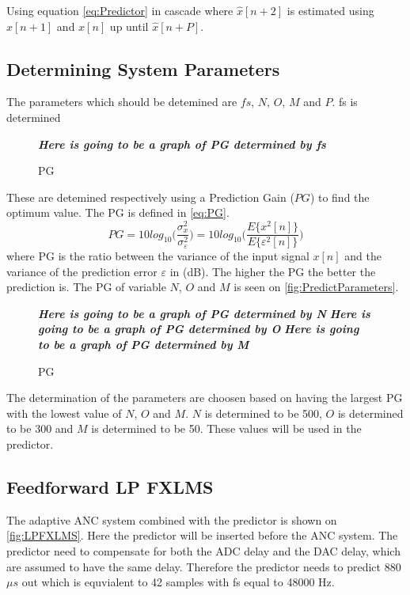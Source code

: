 Using equation \ref{eq:Predictor} in cascade where $\hat{x}[n+2]$ is estimated using $\hat{x}[n+1]$ and $x[n]$ up until $\hat{x}[n+P]$. 

\subsection{Determining System Parameters}
The parameters which should be detemined are $fs$, $N$, $O$, $M$ and $P$. fs is determined   


\begin{figure}[H]
	\centering
	\textbf{\textit{Here is going to be a graph of PG determined by fs}}
	\caption{PG }
	\label{fig:fsPredict}
\end{figure}


These are detemined respectively using a Prediction Gain ($PG$) to find the optimum value. The PG is defined in \autoref{eq:PG}. 
\begin{equation}\label{eq:PG}
PG = 10 log_{10}\bigg(\frac{\sigma^2_x}{\sigma^2_\varepsilon}\bigg) = 10 log_{10}\bigg(\frac{E\{x^2[n]\}}{E\{\varepsilon^2[n]\}}\bigg)
\end{equation}
where PG is the ratio between the variance of the input signal $x[n]$ and the variance of the prediction error $\varepsilon$ in (dB). The higher the PG the better the prediction is. The PG of variable $N$, $O$ and $M$ is seen on \autoref{fig:PredictParameters}. 
\begin{figure}[H]
	\centering
	\textbf{\textit{Here is going to be a graph of PG determined by N}}
	\textbf{\textit{Here is going to be a graph of PG determined by O}}
	\textbf{\textit{Here is going to be a graph of PG determined by M}}
	\caption{PG }
	\label{fig:PredictParameters}
\end{figure}

The determination of the parameters are choosen based on having the largest PG with the lowest value of $N$, $O$ and $M$. $N$ is determined to be 500, $O$ is determined to be 300 and $M$ is determined to be 50. These values will be used in the predictor.

\subsection{Feedforward LP FXLMS}
The adaptive ANC system combined with the predictor is shown on \autoref{fig:LPFXLMS}. Here the predictor will be inserted before the ANC system. The predictor need to compensate for both the ADC delay and the DAC delay, which are assumed to have the same delay. Therefore the predictor needs to predict $880$ $\mu s$ out which is equvialent to 42 samples with fs equal to 48000 Hz.      

